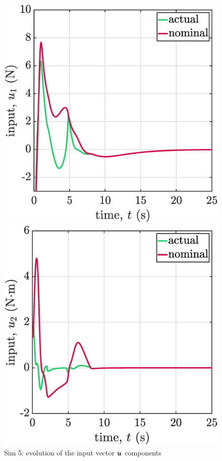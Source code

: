 \begin{figure}[!ht]
    \begin{minipage}[t]{.45\textwidth}
        \centering
        \includegraphics[width=\textwidth]{figures/sim5u1.eps}
    \end{minipage}
    \hfill
    \begin{minipage}[t]{.45\textwidth}
        \centering
        \includegraphics[width=\textwidth]{figures/sim5u2.eps}
    \end{minipage}
    \caption{\label{fig:sim5u2} Sim 5: evolution of the input vector $\boldsymbol{u}$ components}
\end{figure}

